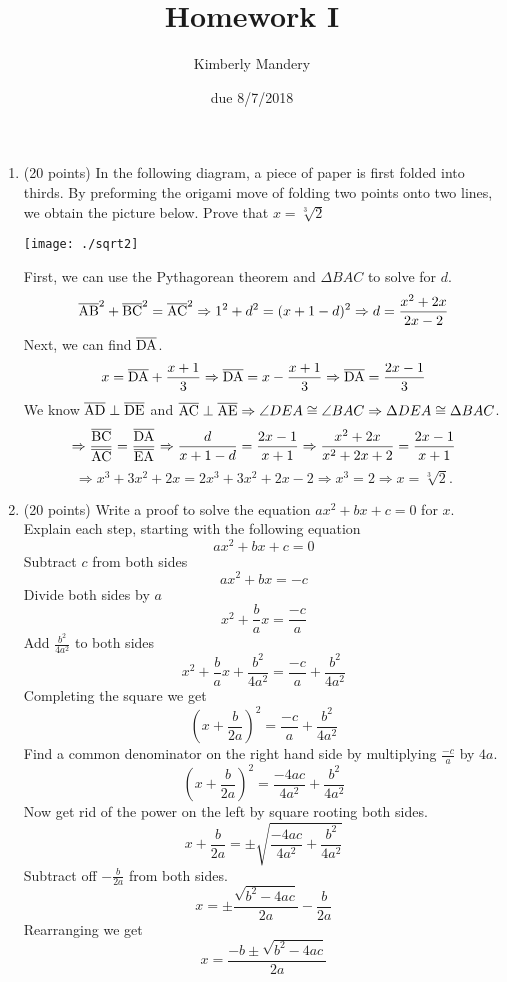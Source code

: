 \documentclass[16pt]{article}
\begin{document}
\title{Homework I}
\author{Kimberly Mandery}
\date{due 8/7/2018} 
\maketitle
\begin{enumerate}
\item (20 points) In the following diagram, a piece of paper is first folded into thirds. By preforming the origami move of folding two points onto two lines, we obtain the picture below. Prove that $x=\sqrt[3]{2}$
\begin{center}
\texttt{[image: ./sqrt2]}
\end{center}
First, we can use the Pythagorean theorem and $\Delta BAC$ to solve for $d$.
\[\overline{\rm AB}^2 +\overline{\rm BC}^2=\overline{\rm AC}^2 \\
\Rightarrow 1^2+d^2=(x+1-d)^2\\
\Rightarrow d=\frac{x^2+2x}{2x-2}\]
Next, we can find $\overline{\rm DA}$. 
\[x=\overline{\rm DA}+\frac{x+1}{3}
\Rightarrow\overline{\rm DA}=x-\frac{x+1}{3}
\Rightarrow\overline{\rm DA}=\frac{2x-1}{3}\]
We know $\overline{\rm AD}\perp\overline{\rm DE}$ and $\overline{\rm AC}\perp\overline{\rm AE} \Rightarrow \angle DEA \cong \angle BAC \Rightarrow \Delta DEA \cong \Delta BAC$.
\[\Rightarrow\frac{\overline{\rm BC}}{\overline{\rm AC}} = \frac{\overline{\rm DA}}{\overline{\rm EA}}
\Rightarrow \frac{d}{x+1-d}=\frac{2x-1}{x+1}
\Rightarrow\frac{x^2+2x}{x^2+2x+2}=\frac{2x-1}{x+1}\]
\[\Rightarrow x^3+3x^2+2x=2x^3+3x^2+2x-2
\Rightarrow x^3 = 2 \Rightarrow x=\sqrt[3]{2}.\]
\raggedright
\item(20 points) Write a proof to solve the equation $ax^2+bx+c=0$ for $x$. Explain each step, starting with the following equation\\
\[ax^2+bx+c=0\]
Subtract $c$ from both sides
\[ax^2+bx=-c\]
Divide both sides by $a$
\[x^2+\frac{b}{a}x=\frac{-c}{a}\]
Add $\frac{b^2}{4a^2}$ to both sides
\[x^2+\frac{b}{a}x+\frac{b^2}{4a^2}=\frac{-c}{a}+\frac{b^2}{4a^2}\]
Completing the square we get
\[(x+\frac{b}{2a})^2=\frac{-c}{a}+\frac{b^2}{4a^2}\]
Find a common denominator on the right hand side by multiplying $\frac{-c}{a}$ by $4a$.
\[(x+\frac{b}{2a})^2=\frac{-4ac}{4a^2}+\frac{b^2}{4a^2}\]
Now get rid of the power on the left by square rooting both sides.
\[x+\frac{b}{2a}=\pm\sqrt{\frac{-4ac}{4a^2}+\frac{b^2}{4a^2}}\]
Subtract off $-\frac{b}{2a}$ from both sides.
\[x=\pm\frac{\sqrt{b^2-4ac}}{2a}-\frac{b}{2a}\]
Rearranging we get
\[x=\frac{-b\pm\sqrt{b^2-4ac}}{2a}\]




\end{enumerate}
\end{document}
